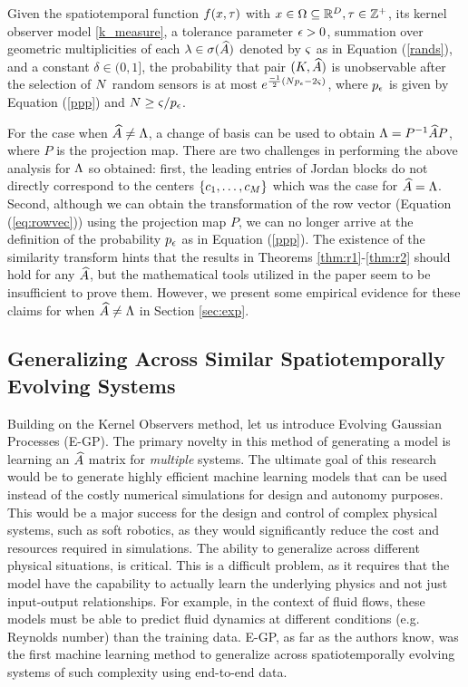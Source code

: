 \begin{theorem}\label{thm:r2}
	Given the spatiotemporal function $ f(x,\tau) $ with $ x \in \Omega \subseteq  \mathbb{R}^{D}, \tau\in \mathbb{Z}^+  $, its kernel observer model \eqref{k_measure}, a tolerance parameter $\epsilon>0$, summation over geometric multiplicities of each $ \lambda \in \sigma(\widehat{A}) $ denoted by $ \varsigma  $ as in Equation (\ref{rands}), and a constant $ \delta \in (0,1] $, the probability that pair $ (K, \widehat{A}) $ is unobservable after the selection of $ N $ random sensors is at most $ e^{\frac{-1}{2}(N p_{\epsilon}-2\varsigma)} $, where $ p_{\epsilon} $ is given by Equation (\ref{ppp}) and $ N \geq \varsigma/p_{\epsilon} $.
\end{theorem}
For the case when $ \widehat{A} \neq \Lambda $, a change of basis can be used to obtain $ \Lambda = P^{-1}\widehat{A} P $, where $ P $ is the projection map. There are two challenges in performing the above analysis for $\Lambda$ so obtained: first, the leading entries of Jordan blocks do not directly correspond to the centers $\{ c_1,\dots,c_M\}$ which was the case for $ \widehat{A} = \Lambda $. Second, although we can obtain the transformation of the row vector (Equation (\ref{eq:rowvec})) using the projection map $P$, we can no longer arrive at the definition of the probability $p_{\epsilon}$ as in Equation (\ref{ppp}). The existence of the similarity transform hints that the results in Theorems \ref{thm:r1}-\ref{thm:r2} should hold for any $ \widehat{A}$, but the mathematical tools utilized in the paper seem to be insufficient to prove them. However, we present some empirical evidence for these claims for when $ \widehat{A} \neq \Lambda $  in Section \ref{sec:exp}.


\subsection{Generalizing Across Similar Spatiotemporally Evolving Systems}
Building on the Kernel Observers method, let us introduce Evolving Gaussian Processes (E-GP). The primary novelty in this method of generating a model is learning an $\widehat{A}$ matrix for \emph{multiple} systems. The ultimate goal of this research would be to generate highly efficient machine learning models that can be used instead of the costly numerical simulations for design and autonomy purposes. This would be a major success for the design and control of complex physical systems, such as soft robotics, as they would significantly reduce the cost and resources required in simulations. The ability to generalize across different physical situations, is critical. This is a difficult problem, as it requires that the model have the capability to actually learn the underlying physics and not just input-output relationships. For example, in the context of fluid flows, these models must be able to predict fluid dynamics at different conditions (e.g. Reynolds number) than the training data. E-GP, as far as the authors know, was the first machine learning method to generalize across spatiotemporally evolving systems of such complexity using end-to-end data.

